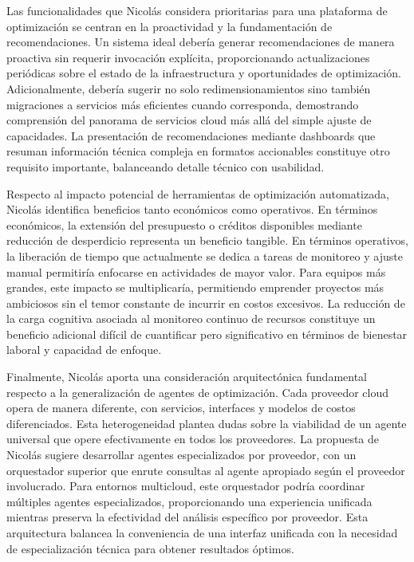 Las funcionalidades que Nicolás considera prioritarias para una plataforma de optimización se centran en la proactividad y la fundamentación de recomendaciones. Un sistema ideal debería generar recomendaciones de manera proactiva sin requerir invocación explícita, proporcionando actualizaciones periódicas sobre el estado de la infraestructura y oportunidades de optimización. Adicionalmente, debería sugerir no solo redimensionamientos sino también migraciones a servicios más eficientes cuando corresponda, demostrando comprensión del panorama de servicios cloud más allá del simple ajuste de capacidades. La presentación de recomendaciones mediante dashboards que resuman información técnica compleja en formatos accionables constituye otro requisito importante, balanceando detalle técnico con usabilidad.

Respecto al impacto potencial de herramientas de optimización automatizada, Nicolás identifica beneficios tanto económicos como operativos. En términos económicos, la extensión del presupuesto o créditos disponibles mediante reducción de desperdicio representa un beneficio tangible. En términos operativos, la liberación de tiempo que actualmente se dedica a tareas de monitoreo y ajuste manual permitiría enfocarse en actividades de mayor valor. Para equipos más grandes, este impacto se multiplicaría, permitiendo emprender proyectos más ambiciosos sin el temor constante de incurrir en costos excesivos. La reducción de la carga cognitiva asociada al monitoreo continuo de recursos constituye un beneficio adicional difícil de cuantificar pero significativo en términos de bienestar laboral y capacidad de enfoque.

Finalmente, Nicolás aporta una consideración arquitectónica fundamental respecto a la generalización de agentes de optimización. Cada proveedor cloud opera de manera diferente, con servicios, interfaces y modelos de costos diferenciados. Esta heterogeneidad plantea dudas sobre la viabilidad de un agente universal que opere efectivamente en todos los proveedores. La propuesta de Nicolás sugiere desarrollar agentes especializados por proveedor, con un orquestador superior que enrute consultas al agente apropiado según el proveedor involucrado. Para entornos multicloud, este orquestador podría coordinar múltiples agentes especializados, proporcionando una experiencia unificada mientras preserva la efectividad del análisis específico por proveedor. Esta arquitectura balancea la conveniencia de una interfaz unificada con la necesidad de especialización técnica para obtener resultados óptimos.

